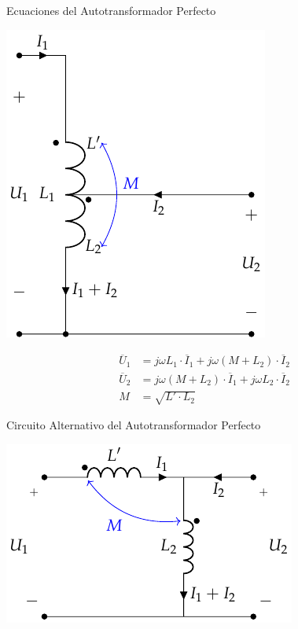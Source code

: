 \documentclass[aspectratio=169, usenames,svgnames,dvipsnames]{beamer}
\begin{document}
\begin{frame}[label={sec:orgbe78745}]{Ecuaciones del Autotransformador Perfecto}
\begin{center}
\includegraphics[height=0.6\textheight]{../figs/AutotrafoPerfecto.pdf}
\end{center}
\begin{align*}
  \overline{U}_1 &= j \omega L_1 \cdot \overline{I}_1 + j \omega (M + L_2) \cdot \overline{I}_2\\
  \overline{U}_2 &= j \omega (M + L_2) \cdot \overline{I}_1 + j \omega L_2 \cdot \overline{I}_2\\
  M &= \sqrt{L' \cdot L_2}
\end{align*}
\end{frame}
\begin{frame}[label={sec:org7975dd0}]{Circuito Alternativo del Autotransformador Perfecto}
\begin{center}
\includegraphics[height=0.8\textheight]{../figs/AutotrafoPerfecto2.pdf}
\end{center}
\end{frame}
\end{document}
